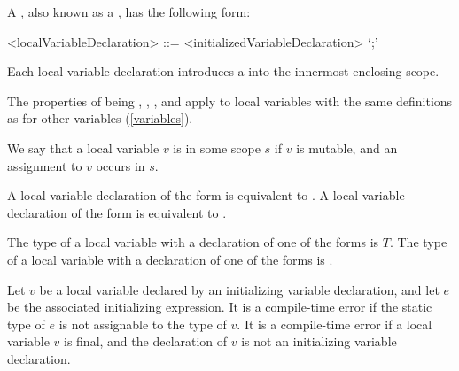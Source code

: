 \documentclass[makeidx]{article}
\begin{document}
{\LMHash{}%
A ,
also known as a ,
has the following form:

\begin{grammar}
<localVariableDeclaration> ::= <initializedVariableDeclaration> `;'
\end{grammar}

\LMHash{}%
Each local variable declaration introduces
a 
into the innermost enclosing scope.


\LMHash{}%
The properties of being
,
,
, and
apply to local variables with the same definitions as for other variables
(\ref{variables}).

\LMHash{}%
We say that a local variable $v$ is 
in some scope $s$
if $v$ is mutable, and an assignment to $v$ occurs in $s$.

\LMHash{}%
A local variable declaration of the form  is equivalent to .
A local variable declaration of the form  is equivalent to .


\LMHash{}%
The type of a local variable with a declaration of one of the forms
is $T$.
The type of a local variable with a declaration of one of the forms
is \DYNAMIC{}.

\LMHash{}%
Let $v$ be a local variable declared by an initializing variable declaration,
and let $e$ be the associated initializing expression.
It is a compile-time error if the static type of $e$ is not assignable to the type of $v$.
It is a compile-time error if a local variable $v$ is final,
and the declaration of $v$ is not an initializing variable declaration.


}
\end{document}

